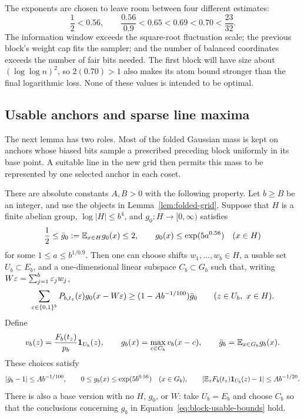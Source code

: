 The exponents are chosen to leave room between four different estimates:
\[
 \frac12<0.56,\qquad
 \frac{0.56}{0.9}<0.65<0.69<0.70<\frac{23}{32}.
\]
The information window exceeds the square-root fluctuation scale; the
previous block's weight cap fits the sampler; and the number of balanced
coordinates exceeds the number of fair bits needed.  The first block will
have size about $(\log\log n)^2$, so $2(0.70)>1$ also makes its atom
bound stronger than the final logarithmic loss.  None of these values
is intended to be optimal.

\subsection{Usable anchors and sparse line maxima}

The next lemma has two roles.  Most of the folded Gaussian mass is kept on
anchors whose biased bits sample a prescribed preceding block uniformly
in its base point.  A suitable line in the new grid then permits this mass
to be represented by one selected anchor in each coset.

\begin{lemma}
\label{lem:usable}
There are absolute constants $A,B>0$ with the following property.
Let $b\ge B$ be an integer, and use the objects in
Lemma~\ref{lem:folded-grid}.  Suppose that $H$ is a finite abelian group,
$\log|H|\le b^4$, and $g_0:H\to[0,\infty)$ satisfies
\[
 \frac12\le\bar g_0:=\mathbb E_{x\in H}g_0(x)\le2,\qquad
 g_0(x)\le\exp(5a^{0.56})\quad(x\in H)
\]
for some $1\le a\le b^{1/0.9}$.  Then one can choose shifts
$w_1,\ldots,w_b\in H$, a usable set $U_b\subset E_b$, and a
one-dimensional linear subspace $C_b\subset G_b$ such that, writing
$W\varepsilon=\sum_{j=1}^b\varepsilon_jw_j$,
\begin{equation}
 \sum_{\varepsilon\in\{0,1\}^b}P_{b,t_z}(\varepsilon)g_0(x-W\varepsilon)
       \ge(1-A b^{-1/100})\bar g_0
       \qquad(z\in U_b,\ x\in H).
 \label{eq:block-biased-sampler}
\end{equation}
Define
\begin{equation}
 v_b(z)=\frac{F_b(t_z)}{p_b}\mathbf 1_{U_b}(z),\qquad
 g_b(x)=\max_{c\in C_b}v_b(x-c),\qquad
 \bar g_b=\mathbb E_{x\in G_b}g_b(x).
 \label{eq:block-line-weight}
\end{equation}
These choices satisfy
\begin{equation}
 |\bar g_b-1|\le A b^{-1/100},\qquad
 0\le g_b(x)\le\exp(5b^{0.56})\quad(x\in G_b),\qquad
 \left|\mathbb E_z F_b(t_z)\mathbf 1_{U_b}(z)-1\right|
       \le A b^{-1/20}.
 \label{eq:block-usable-bounds}
\end{equation}
There is also a base version with no $H$, $g_0$, or $W$: take $U_b=E_b$
and choose $C_b$ so that the conclusions concerning $g_b$ in
Equation~\eqref{eq:block-usable-bounds} hold.
\end{lemma}

